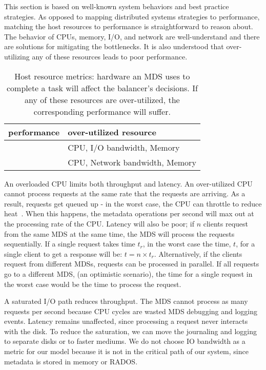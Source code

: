 This section is based on well-known system behaviors and best practice strategies. As opposed to mapping distributed systems strategies to performance, matching the host resources to performance is straightforward to reason about. The behavior of CPUs, memory, I/O, and network are well-understand and there are solutions for mitigating the bottlenecks. It is also understood that over-utilizing any of these resources leads to poor performance. 

\begin{table}
	\centering
	\caption{Host resource metrics: hardware an MDS uses to complete a task will affect the balancer's decisions. If any of these resources are over-utilized, the corresponding performance will suffer. \label{table-overutilized}}
	\begin{ssp}	
	\begin{tabular}{ 
					>{\centering}m{1.5cm} || 
					>{}m{6cm}}					
					performance
					& \centering over-utilized resource
					 \tabularnewline \hline\hline
	\multicolumn{1}{r||}{throughput \(\downarrow\)}
					& CPU, I/O bandwidth, Memory
					\tabularnewline
	\multicolumn{1}{r||}{responsiveness \(\downarrow\)}
					& CPU, Network bandwidth, Memory
					\tabularnewline																
    \end{tabular}
  	\end{ssp}	    
\end{table}

An overloaded CPU limits both throughput and latency. An over-utilized CPU cannot process requests at the same rate that the requests are arriving. As a result, requests get queued up - in the worst case, the CPU can throttle to reduce heat~\cite{sevilla:discs2013-framework}. When this happens, the metadata operations per second will max out at the processing rate of the CPU. Latency will also be poor; if \(n\) clients request from the same MDS at the same time, the MDS will process the requests sequentially. If a single request takes time \(t_r\), in the worst case the time, \(t\), for a single client to get a response will be: \(t = n \times t_r\). Alternatively, if the clients request from different MDSs, requests can be processed in parallel. If all requests go to a different MDS, (an optimistic scenario), the time for a single request in the worst case would be the time to process the request. 

A saturated I/O path reduces throughput. The MDS cannot process as many requests per second because CPU cycles are wasted MDS debugging and logging events. Latency remains unaffected, since processing a request never interacts with the disk. To reduce the saturation, we can move the journaling and logging to separate disks or to faster mediums. We do not choose IO bandwidth as a metric for our model because it is not in the critical path of our system, since metadata is stored in memory or RADOS. 

